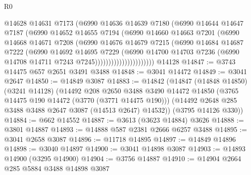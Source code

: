 \begin{lexlean}{R0}
\begin{coremodule}
                            @14628
                            @14631
                            @7173
                            (@6990
                              @14636
                              @14639
                              @7180
                              (@6990
                                @14644
                                @14647
                                @7187
                                (@6990
                                  @14652
                                  @14655
                                  @7194
                                  (@6990
                                    @14660
                                    @14663
                                    @7201
                                    (@6990
                                      @14668
                                      @14671
                                      @7208
                                      (@6990
                                        @14676
                                        @14679
                                        @7215
                                        (@6990
                                          @14684
                                          @14687
                                          @7222
                                          (@6990
                                            @14692
                                            @14695
                                            @7229
                                            (@6990
                                              @14700
                                              @14703
                                              @7236
                                              (@6990 @14708 @14711 @7243 @7245))))))))))))))))))))))
    @14128
@14847 := @3743 @14475 @657 @2651 @3491 @3488
@14848 := @3041 @14472
@14849 := @3041 @2647
@14850 := @14849 @3087
@14883 := @14842
    (@14847
      (@14848 @14850)
      (@3241 @14128)
      (@14492
        @208
        @2650
        @3488
        @3490
        @14472
        @14850
        (@3765 @14475 @190 @14472 (@3770 (@3771 @14475 @190)))
        (@14492 @2648 @285 @3488 @3488 @2647 @3087 (@14513 @2647) @14532))
      (@3795 @14126 @330))
@14884 := @662 @14552
@14887 := @3613 (@3623 @14884) @3626
@14888 := @3801 @14887
@14893 := @14888 @587 @2381 @2666 @6257 @3488
@14895 := @3041 @2658 @3087
@14896 := @11718 @14895
@14897 := @14849 @14896
@14898 := @3040 @14897
@14900 := @3041 @14898 @3087
@14903 := @14893 @14900 (@3295 @14900)
@14904 := @3756 @14887
@14910 := @14904 @2664 @285 @5884 @3488 @14898 @3087

\end{coremodule}
\end{lexlean}
